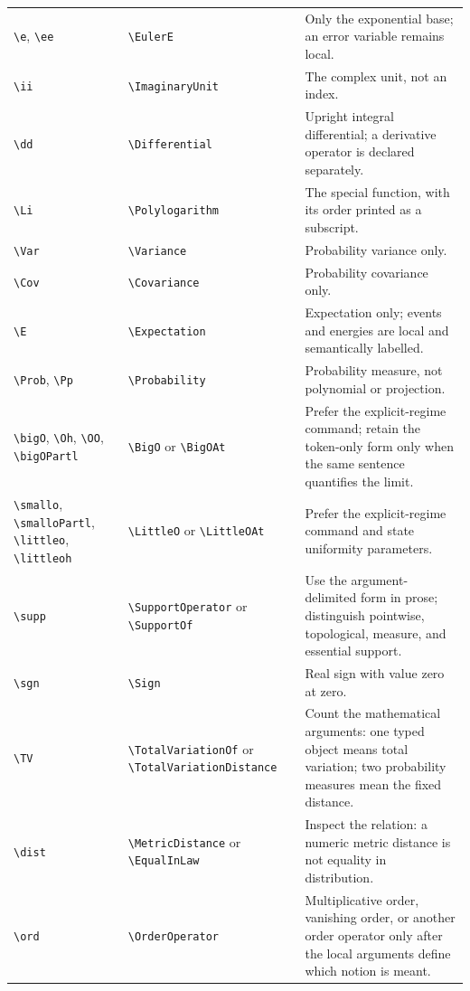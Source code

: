 \documentclass[11pt,oneside]{article}
\theoremstyle{definition}
\theoremstyle{remark}
\DeclareRobustCommand{\commandname}[1]{\texttt{\textbackslash#1}}
\begin{document}
\begin{longtable}{@{}p{}p{}p{}@{}}
\commandname{e}, \commandname{ee} & \commandname{EulerE} & Only the exponential base;
an error variable remains local.\\
\commandname{ii} & \commandname{ImaginaryUnit} & The complex unit, not an index.\\
\commandname{dd} & \commandname{Differential} & Upright integral differential; a
derivative operator is declared separately.\\
\commandname{Li} & \commandname{Polylogarithm} & The special function, with its order
printed as a subscript.\\
\commandname{Var} & \commandname{Variance} & Probability variance only.\\
\commandname{Cov} & \commandname{Covariance} & Probability covariance only.\\
\commandname{E} & \commandname{Expectation} & Expectation only; events and energies are
local and semantically labelled.\\
\commandname{Prob}, \commandname{Pp} & \commandname{Probability} & Probability measure,
not polynomial or projection.\\
\commandname{bigO}, \commandname{Oh}, \commandname{OO},
\commandname{bigOPartl} &
\commandname{BigO} or \commandname{BigOAt} & Prefer
the explicit-regime command; retain the token-only form only when the same sentence
quantifies the limit.\\
\commandname{smallo}, \commandname{smalloPartl}, \commandname{littleo},
\commandname{littleoh} &
\commandname{LittleO} or \commandname{LittleOAt} & Prefer the explicit-regime command
and state uniformity parameters.\\
\commandname{supp} & \commandname{SupportOperator} or \commandname{SupportOf} & Use the
argument-delimited form in prose; distinguish pointwise, topological, measure, and
essential support.\\
\commandname{sgn} & \commandname{Sign} & Real sign with value zero at zero.\\
\commandname{TV} & \commandname{TotalVariationOf} or
\commandname{TotalVariationDistance} & Count the mathematical arguments: one typed
object means total variation; two probability measures mean the fixed distance.\\
\commandname{dist} & \commandname{MetricDistance} or \commandname{EqualInLaw} & Inspect
the relation: a numeric metric distance is not equality in distribution.\\
\commandname{ord} & \commandname{OrderOperator} & Multiplicative order, vanishing order,
or another order operator only after the local arguments define which notion is meant.\\

\end{longtable}
\end{document}
